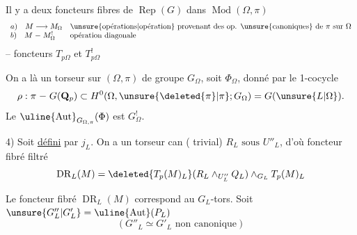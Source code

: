 
Il y a deux foncteurs fibres de $\operatorname{Rep}(G)$ dans $\operatorname{Mod}(\Omega,\pi)$
\[
\begin{array}{ll}
a)\quad M\longrightarrow M_\Omega &
\text{\unsure{opérations|opération} provenant des op. \unsure{canoniques} de }\pi\text{ sur }\Omega\\
b)\quad M\mathrel{-}M_\Omega^! &\text{opération diagonale}
\end{array}
\]
-- foncteurs $T_{p\Omega}$ et $T^!_{p\Omega}$

 On a là un \deleted{$(\Omega,\pi)$} torseur  sur
$(\Omega,\pi)$ de groupe $G_\Omega$, soit $\Phi_\Omega$, donné par le 1-cocycle
\[
\rho:\pi\mathrel{-}G(\mathbf Q_p)\subset H^0(\Omega,\unsure{\deleted{\pi}|\pi};G_\Omega)=G(\unsure{L|\Omega}).
\]
Le  $\uline{\operatorname{Aut}}_{G_{\Omega,\pi}}(\Phi)$ est $G_\Omega^!$.
\margin{$(\Omega,\pi)$}

4) Soit
\uline{défini} par $j_L$. On a un torseur
 can ( trivial)
$\boxed{R_L\text{ sous }U''_L}$, d'où foncteur fibré filtré
\[
\operatorname{DR}_L(M)=\deleted{T_p(M)_L}
(R_L\wedge_{U''_L}Q_L)\wedge_{G_L}T_p(M)_L
\]

 Le foncteur fibré $\operatorname{DR}_L(M)$ correspond au $G_L$-tors.
Soit $\unsure{G''_L|G'_L}=\uline{\operatorname{Aut}}(P_L)$
\[
(G''_L\simeq G'_L\text{ non canonique})
\]

